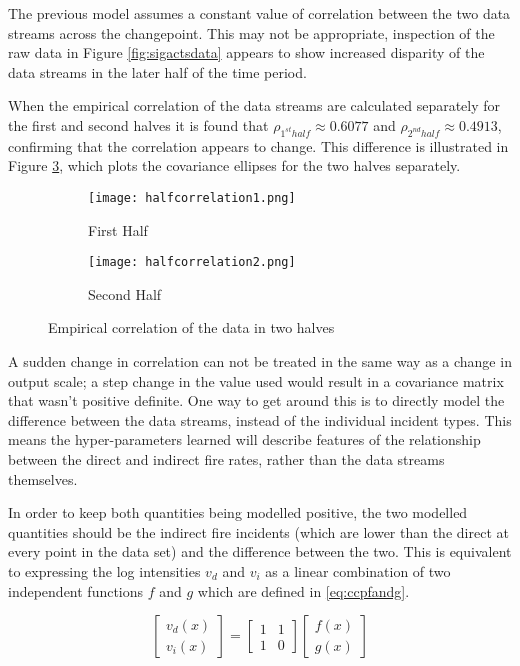 \documentclass[a4paper,11pt]{report}
\begin{document}
The previous model assumes a constant value of correlation between the two data streams across the changepoint. This may not be appropriate, inspection of the raw data in Figure \ref{fig:sigactsdata} appears to show increased disparity of the data streams in the later half of the time period. 

When the empirical correlation of the data streams are calculated separately for the first and second halves it is found that \(\rho_{1^{st} half} \approx 0.6077 \) and \(\rho_{2^{nd} half} \approx 0.4913\), confirming that the correlation appears to change. This difference is illustrated in Figure \ref{fig:halfcorrelation}, which plots the covariance ellipses for the two halves separately.  \par
 
\begin{figure}
\centering
\begin{subfigure}{.5\textwidth}
	\centering
	\texttt{[image: halfcorrelation1.png]}
  	\caption{First Half}
  	\label{fig:sub1}
\end{subfigure}%
\begin{subfigure}{.5\textwidth}
  	\centering
  	\texttt{[image: halfcorrelation2.png]}
  	\caption{Second Half}
 	 \label{fig:sub2}
\end{subfigure}
\caption{Empirical correlation of the data in two halves}
\label{fig:halfcorrelation}
\end{figure}

A sudden change in correlation can not be treated in the same way as a change in output scale; a step change in the value used would result in a covariance matrix that wasn't positive definite. One way to get around this is to directly model the difference between the data streams, instead of the individual incident types. This means the hyper-parameters learned will describe features of the relationship between the direct and indirect fire rates, rather than the data streams themselves. \par 

In order to keep both quantities being modelled positive, the two modelled quantities should be the indirect fire incidents (which are lower than the direct at every point in the data set) and the difference between the two. This is equivalent to expressing the log intensities \(v_d\) and \(v_i\) as a linear combination of two independent functions \(f\) and \(g\) which are defined in \ref{eq:ccpfandg}.

\begin{equation} 
\left[ \begin{array}{cc}
v_{d}(x)  \\
v_{i}(x) \end{array} \right] = \left[ \begin{array}{cc}
1 & 1  \\
1  & 0 \end{array} \right] \left[ \begin{array}{cc}
f(x)  \\
g(x) \end{array} \right]
\end{equation}
\end{document}
